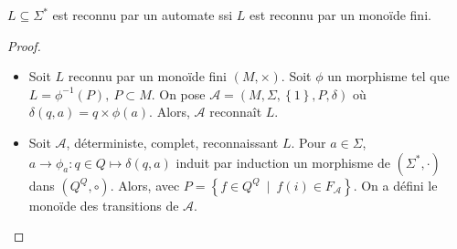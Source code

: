 \documentclass{cours}
\begin{document}
\begin{proposition}
    $L\subseteq \Sigma^{*}$ est reconnu par un automate ssi $L$ est reconnu par un monoïde fini.
\end{proposition}
\begin{proof}
    \begin{itemize}
        \item Soit $L$ reconnu par un monoïde fini $(M, \times)$. Soit $\phi$ un morphisme tel que $L = \phi^{-1}(P), \ P\subset M$. On pose $\mathcal{A} = (M, \Sigma, \left\{1\right\}, P, \delta)$ où $\delta(q, a) = q \times \phi(a)$. Alors, $\mathcal{A}$ reconnaît $L$.
        \item Soit $\mathcal{A}$, déterministe, complet, reconnaissant $L$. Pour $a \in \Sigma$, $a \rightarrow \phi_{a} : q\in Q \mapsto \delta(q, a)$ induit par induction un morphisme de $(\Sigma^{*}, \cdot)$ dans $(Q^{Q}, \circ)$. Alors, avec $P = \left\{f \in Q^{Q}\ \mid \ f(i) \in F_{\mathcal{A}}\right\}$. On a défini le monoïde des transitions de $\mathcal{A}$.
    \end{itemize}
\end{proof}
\end{document}
